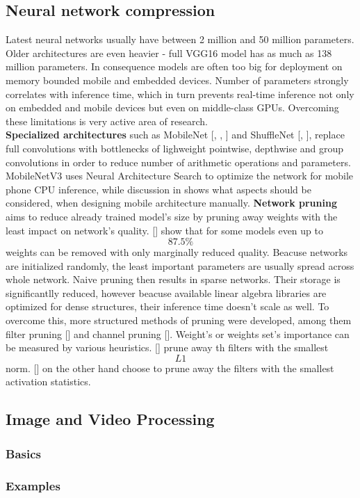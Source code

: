 \documentclass[../Main.tex]{subfiles}
\begin{document}
\subsection{Neural network compression}
    Latest neural networks usually have between 2 million and 50 million parameters.
    Older architectures are even heavier - full VGG16 model has as much as
    138 million parameters. In consequence models 
    are often too big for deployment on memory bounded mobile and embedded devices.
    Number of parameters strongly correlates with inference time, which in turn
    prevents real-time inference not only on embedded and mobile
    devices but even on middle-class GPUs. Overcoming these limitations 
    is very active area of research.\\
    \textbf{Specialized architectures} such as MobileNet [\cite{mobilenetv1},
    \cite{mobilenetv2}, \cite{mobilenetv3}] and ShuffleNet [\cite{shufflenetv1},
    \cite{shufflenetv2}], replace full convolutions with bottlenecks of lighweight
    pointwise, depthwise and group convolutions in order to reduce number of 
    arithmetic operations and parameters. MobileNetV3 \cite{mobilenetv3} uses
    Neural Architecture Search to optimize the network for mobile phone CPU
    inference, while discussion in \cite{shufflenetv2} shows what aspects should
    be considered, when designing mobile architecture manually. 
    \textbf{Network pruning} aims to reduce already trained model's size by pruning away
    weights with the least impact on network's quality. [\cite{zhu2017prune}] show
    that for some models even up to \[87.5\%\] weights can be removed with only 
    marginally reduced quality. 
    Beacuse networks are initialized randomly, the least
    important parameters are usually spread across whole network. Naive pruning 
    then results in sparse networks. Their storage is significantlly reduced, however
    beacuse available linear algebra libraries are optimized for dense structures,
    their inference time doesn't scale as well. To overcome this, more structured
    methods of pruning were developed, among them filter pruning [\cite{li2016pruning}]
    and channel pruning [\cite{he2017channel}]. Weight's or weights set's importance
    can be measured by various heuristics. 
    [\cite{li2016pruning}] prune away th filters with the smallest \[L1\] norm.
    [\cite{polyak2015}] on the other hand choose to prune away the filters with
    the smallest activation statistics.


\subsection{Image and Video Processing}
    \subsubsection{Basics}
    \subsubsection{Examples}


\biblio %
\end{document}

